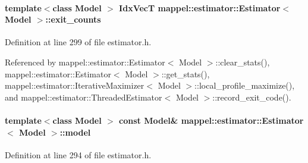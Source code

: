 \paragraph[{\texorpdfstring{exit\+\_\+counts}{exit_counts}}]{\setlength{\rightskip}{0pt plus 5cm}template$<$class Model $>$ {\bf Idx\+VecT} {\bf mappel\+::estimator\+::\+Estimator}$<$ Model $>$\+::exit\+\_\+counts\hspace{0.3cm}{\ttfamily [protected]}}\hypertarget{classmappel_1_1estimator_1_1Estimator_aa946d9789a1299d684f83a822a10caa7}{}\label{classmappel_1_1estimator_1_1Estimator_aa946d9789a1299d684f83a822a10caa7}


Definition at line 299 of file estimator.\+h.



Referenced by mappel\+::estimator\+::\+Estimator$<$ Model $>$\+::clear\+\_\+stats(), mappel\+::estimator\+::\+Estimator$<$ Model $>$\+::get\+\_\+stats(), mappel\+::estimator\+::\+Iterative\+Maximizer$<$ Model $>$\+::local\+\_\+profile\+\_\+maximize(), and mappel\+::estimator\+::\+Threaded\+Estimator$<$ Model $>$\+::record\+\_\+exit\+\_\+code().

\paragraph[{\texorpdfstring{model}{model}}]{\setlength{\rightskip}{0pt plus 5cm}template$<$class Model $>$ const Model\& {\bf mappel\+::estimator\+::\+Estimator}$<$ Model $>$\+::model\hspace{0.3cm}{\ttfamily [protected]}}\hypertarget{classmappel_1_1estimator_1_1Estimator_a2f157410771fb79a20d4d54e505750d0}{}\label{classmappel_1_1estimator_1_1Estimator_a2f157410771fb79a20d4d54e505750d0}


Definition at line 294 of file estimator.\+h.



